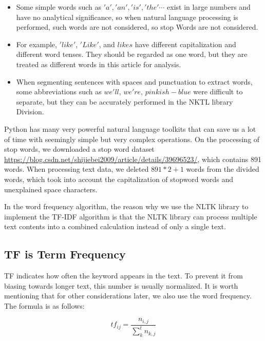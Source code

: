 \documentclass{mcmthesis}
\begin{document}
\begin{itemize}

\item Some simple words such as $'a', 'an', 'is', 'the' \cdots$ exist in large numbers and have no analytical significance, so when natural language processing is performed, such words are not considered, so stop Words are not considered.

\item For example, $'like'$, $'Like'$, and $likes$ have different capitalization and different word tenses. They should be regarded as one word, but they are treated as different words in this article for analysis.

\item When segmenting sentences with spaces and punctuation to extract words, some abbreviations such as $we'll$, $we're$, $pinkish-blue$ were difficult to separate, but they can be accurately performed in the NKTL library Division.

\end{itemize}

Python has many very powerful natural language toolkits that can save us a lot of time with seemingly simple but very complex operations. On the processing of stop words, we downloaded a stop word dataset \url{https://blog.csdn.net/shijiebei2009/article/details/39696523/}, which contains 891 words. When processing text data, we deleted $891 * 2 + 1$ words from the divided words, which took into account the capitalization of stopword words and unexplained space characters.

In the word frequency algorithm, the reason why we use the NLTK library to implement the TF-IDF algorithm is that the NLTK library can process multiple text contents into a combined calculation instead of only a single text.

\subsection{TF is Term Frequency}

TF indicates how often the keyword appears in the text. To prevent it from biasing towards longer text, this number is usually normalized. It is worth mentioning that for other considerations later, we also use the word frequency. The formula is as follows:

\begin{equation}
t f_{i j}=\frac{n_{i, j}}{\sum_{k}^t n_{k, j}}
\end{equation}
\end{document}
